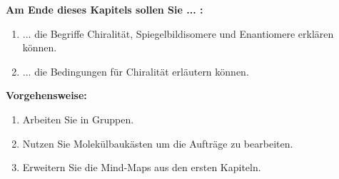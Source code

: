 \documentclass{scrartcl}  %
\begin{document}
		\begin{minipage}{0.7\textwidth}
			\noindent \textbf{Am Ende dieses Kapitels sollen Sie ... :}
			\begin{enumerate}
				\item ... die Begriffe Chiralität, Spiegelbildisomere und Enantiomere erklären können.
				\item ... die Bedingungen für Chiralität erläutern können.
			\end{enumerate}
			\textbf{Vorgehensweise:}
			\begin{enumerate}
				\item Arbeiten Sie in Gruppen.
				\item Nutzen Sie Molekülbaukästen um die Aufträge zu bearbeiten.
				\item Erweitern Sie die Mind-Maps aus den ersten Kapiteln. 
			\end{enumerate}
			
		\end{minipage}
		\hspace{0.1\textwidth}
\end{document}
